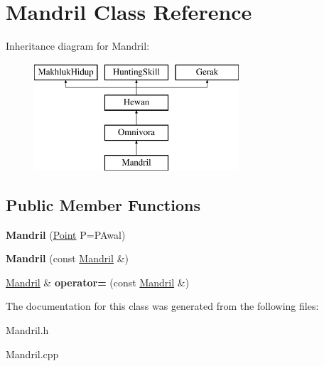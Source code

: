 \hypertarget{class_mandril}{}\section{Mandril Class Reference}
\label{class_mandril}
Inheritance diagram for Mandril\+:\begin{figure}[H]
\begin{center}
\leavevmode
\includegraphics[height=4.000000cm]{class_mandril}
\end{center}
\end{figure}
\subsection*{Public Member Functions}
\begin{DoxyCompactItemize}
\item 
{\bfseries Mandril} (\hyperlink{class_point}{Point} P=P\+Awal)\hypertarget{class_mandril_a11ef35ac9b1dff84f820586488fa1abd}{}\label{class_mandril_a11ef35ac9b1dff84f820586488fa1abd}

\item 
{\bfseries Mandril} (const \hyperlink{class_mandril}{Mandril} \&)\hypertarget{class_mandril_afe36a92ce52c1e048722a069017e9424}{}\label{class_mandril_afe36a92ce52c1e048722a069017e9424}

\item 
\hyperlink{class_mandril}{Mandril} \& {\bfseries operator=} (const \hyperlink{class_mandril}{Mandril} \&)\hypertarget{class_mandril_a49fcc6a4f27ce0562a2fc9cb0527426e}{}\label{class_mandril_a49fcc6a4f27ce0562a2fc9cb0527426e}

\end{DoxyCompactItemize}


The documentation for this class was generated from the following files\+:\begin{DoxyCompactItemize}
\item 
Mandril.\+h\item 
Mandril.\+cpp\end{DoxyCompactItemize}
